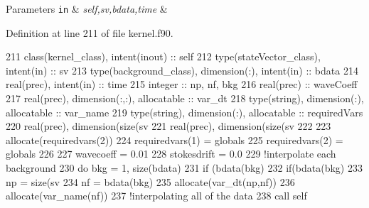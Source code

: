 \begin{DoxyParams}[1]{Parameters}
\mbox{\tt in}  & {\em self,sv,bdata,time} & \\
\hline
\end{DoxyParams}


Definition at line 211 of file kernel.\+f90.


\begin{DoxyCode}
211     \textcolor{keywordtype}{class}(kernel\_class), \textcolor{keywordtype}{intent(inout)} :: self
212     \textcolor{keywordtype}{type}(stateVector\_class), \textcolor{keywordtype}{intent(in)} :: sv
213     \textcolor{keywordtype}{type}(background\_class), \textcolor{keywordtype}{dimension(:)}, \textcolor{keywordtype}{intent(in)} :: bdata
214     \textcolor{keywordtype}{real(prec)}, \textcolor{keywordtype}{intent(in)} :: time
215     \textcolor{keywordtype}{integer} :: np, nf, bkg
216     \textcolor{keywordtype}{real(prec)} :: waveCoeff
217     \textcolor{keywordtype}{real(prec)}, \textcolor{keywordtype}{dimension(:,:)}, \textcolor{keywordtype}{allocatable} :: var\_dt
218     \textcolor{keywordtype}{type}(string), \textcolor{keywordtype}{dimension(:)}, \textcolor{keywordtype}{allocatable} :: var\_name
219     \textcolor{keywordtype}{type}(string), \textcolor{keywordtype}{dimension(:)}, \textcolor{keywordtype}{allocatable} :: requiredVars
220     \textcolor{keywordtype}{real(prec)}, \textcolor{keywordtype}{dimension(size(sv%
221     \textcolor{keywordtype}{real(prec)}, \textcolor{keywordtype}{dimension(size(sv%
222 
223     \textcolor{keyword}{allocate}(requiredvars(2))
224     requiredvars(1) = globals%
225     requiredvars(2) = globals%
226 
227     wavecoeff = 0.01
228     stokesdrift = 0.0
229     \textcolor{comment}{!interpolate each background}
230     \textcolor{keywordflow}{do} bkg = 1, \textcolor{keyword}{size}(bdata)
231         \textcolor{keywordflow}{if} (bdata(bkg)%
232             \textcolor{keywordflow}{if}(bdata(bkg)%
233                 np = \textcolor{keyword}{size}(sv%
234                 nf = bdata(bkg)%
235                 \textcolor{keyword}{allocate}(var\_dt(np,nf))
236                 \textcolor{keyword}{allocate}(var\_name(nf))
237                 \textcolor{comment}{!interpolating all of the data}
238                 \textcolor{keyword}{call }self%
}}
\end{DoxyCode}
